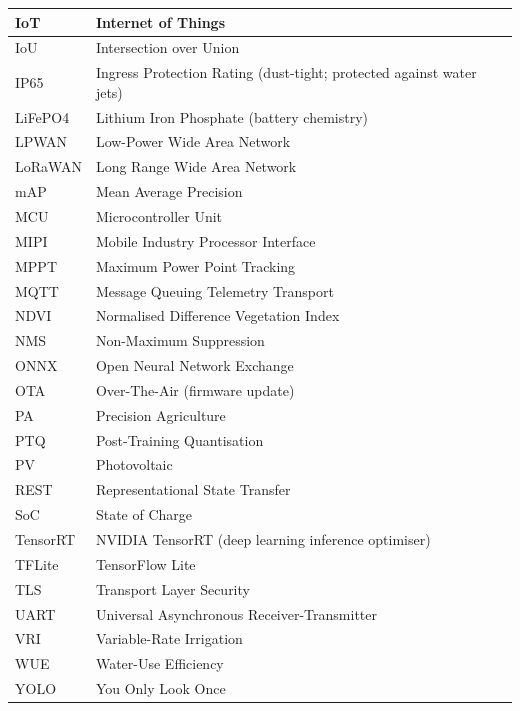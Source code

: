 \documentclass[12pt,a4paper]{report}
\begin{document}
\begin{longtable}{|P{0.22\textwidth}|P{0.68\textwidth}|}
IoT & Internet of Things \\ \hline
IoU & Intersection over Union \\ \hline
IP65 & Ingress Protection Rating (dust-tight; protected against water jets) \\ \hline
LiFePO4 & Lithium Iron Phosphate (battery chemistry) \\ \hline
LPWAN & Low-Power Wide Area Network \\ \hline
LoRaWAN & Long Range Wide Area Network \\ \hline
mAP & Mean Average Precision \\ \hline
MCU & Microcontroller Unit \\ \hline
MIPI & Mobile Industry Processor Interface \\ \hline
MPPT & Maximum Power Point Tracking \\ \hline
MQTT & Message Queuing Telemetry Transport \\ \hline
NDVI & Normalised Difference Vegetation Index \\ \hline
NMS & Non-Maximum Suppression \\ \hline
ONNX & Open Neural Network Exchange \\ \hline
OTA & Over-The-Air (firmware update) \\ \hline
PA & Precision Agriculture \\ \hline
PTQ & Post-Training Quantisation \\ \hline
PV & Photovoltaic \\ \hline
REST & Representational State Transfer \\ \hline
SoC & State of Charge \\ \hline
TensorRT & NVIDIA TensorRT (deep learning inference optimiser) \\ \hline
TFLite & TensorFlow Lite \\ \hline
TLS & Transport Layer Security \\ \hline
UART & Universal Asynchronous Receiver-Transmitter \\ \hline
VRI & Variable-Rate Irrigation \\ \hline
WUE & Water-Use Efficiency \\ \hline
YOLO & You Only Look Once \\ \hline
\end{longtable}
\endgroup
\end{document}
